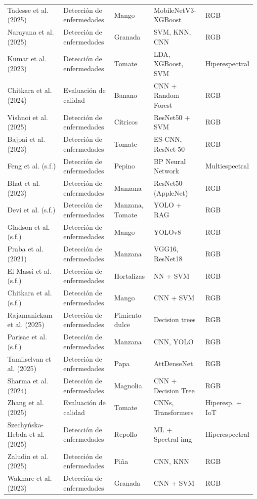 \documentclass[agriculture,article,submit,pdftex,moreauthors]{Definitions/mdpi}
\begin{document}
\begin{footnotesize}
\begin{longtable}{p{3cm} p{2cm} p{2cm} p{2.8cm} p{2cm}}
Tadesse et al. (2025) & Detección de enfermedades & Mango & MobileNetV3-XGBoost & RGB \\
Narayana et al. (2025) & Detección de enfermedades & Granada & SVM, KNN, CNN & RGB \\
Kumar et al. (2023) & Detección de enfermedades & Tomate & LDA, XGBoost, SVM & Hiperespectral \\
Chitkara et al. (2024) & Evaluación de calidad & Banano & CNN + Random Forest & RGB \\
Vishnoi et al. (2025) & Detección de enfermedades & Cítricos & ResNet50 + SVM & RGB \\
Bajpai et al. (2023) & Detección de enfermedades & Tomate & ES-CNN, ResNet-50 & RGB \\
Feng et al. (s.f.) & Detección de enfermedades & Pepino & BP Neural Network & Multiespectral \\
Bhat et al. (2023) & Detección de enfermedades & Manzana & ResNet50 (AppleNet) & RGB \\
Devi et al. (s.f.) & Detección de enfermedades & Manzana, Tomate & YOLO + RAG & RGB \\
Gladson et al. (s.f.) & Detección de enfermedades & Mango & YOLOv8 & RGB \\
Praba et al. (2021) & Detección de enfermedades & Manzana & VGG16, ResNet18 & RGB \\
El Massi et al. (s.f.) & Detección de enfermedades & Hortalizas & NN + SVM & RGB \\
Chitkara et al. (s.f.) & Detección de enfermedades & Mango & CNN + SVM & RGB \\
Rajamanickam et al. (2025) & Detección de enfermedades & Pimiento dulce & Decision trees & RGB \\
Parisae et al. (s.f.) & Detección de enfermedades & Manzana & CNN, YOLO & RGB \\
Tamilselvan et al. (2025) & Detección de enfermedades & Papa & AttDenseNet & RGB \\
Sharma et al. (2024) & Detección de enfermedades & Magnolia & CNN + Decision Tree & RGB \\
Zhang et al. (2025) & Evaluación de calidad & Tomate & CNNs, Transformers & Hiperesp. + IoT \\
Szechyńska-Hebda et al. (2025) & Detección de enfermedades & Repollo & ML + Spectral img & Hiperespectral \\
Zaludin et al. (2025) & Detección de enfermedades & Piña & CNN, KNN & RGB \\
Wakhare et al. (2023) & Detección de enfermedades & Granada & CNN + SVM & RGB \\

\end{longtable}
\end{footnotesize}
\end{document}
